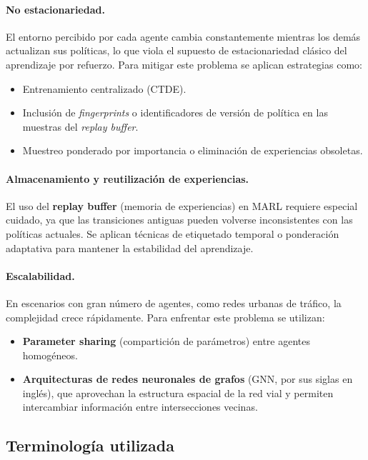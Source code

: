 \paragraph{No estacionariedad.}
El entorno percibido por cada agente cambia constantemente mientras los demás actualizan sus políticas, lo que viola el supuesto de estacionariedad clásico del aprendizaje por refuerzo.  
Para mitigar este problema se aplican estrategias como:
\begin{itemize}
  \item Entrenamiento centralizado (CTDE).
  \item Inclusión de \emph{fingerprints} o identificadores de versión de política en las muestras del \emph{replay buffer}.
  \item Muestreo ponderado por importancia o eliminación de experiencias obsoletas. \cite{foerster2017}
\end{itemize}

\paragraph{Almacenamiento y reutilización de experiencias.}
El uso del \textbf{replay buffer} (memoria de experiencias) en MARL requiere especial cuidado, ya que las transiciones antiguas pueden volverse inconsistentes con las políticas actuales. Se aplican técnicas de etiquetado temporal o ponderación adaptativa para mantener la estabilidad del aprendizaje. \cite{foerster2017}

\paragraph{Escalabilidad.}
En escenarios con gran número de agentes, como redes urbanas de tráfico, la complejidad crece rápidamente. Para enfrentar este problema se utilizan:
\begin{itemize}
  \item \textbf{Parameter sharing} (compartición de parámetros) entre agentes homogéneos.
  \item \textbf{Arquitecturas de redes neuronales de grafos} (GNN, por sus siglas en inglés), que aprovechan la estructura espacial de la red vial y permiten intercambiar información entre intersecciones vecinas. \cite{gnn_traffic}
\end{itemize}


\subsection{Terminología utilizada}

